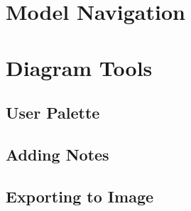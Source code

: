 \section{Model Navigation}
\section{Diagram Tools}
\subsection{User Palette}
\subsection{Adding Notes}
\subsection{Exporting to Image}
